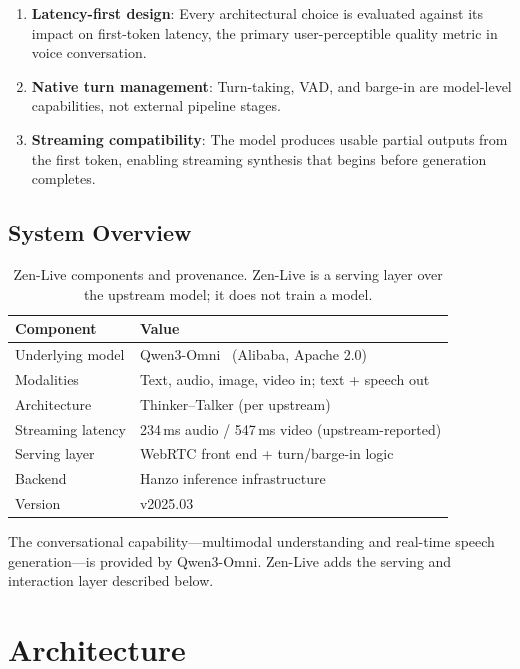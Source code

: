 \documentclass[11pt,a4paper]{article}
\begin{document}
\begin{enumerate}
  \item \textbf{Latency-first design}: Every architectural choice is evaluated against its impact on first-token latency, the primary user-perceptible quality metric in voice conversation.
  \item \textbf{Native turn management}: Turn-taking, VAD, and barge-in are model-level capabilities, not external pipeline stages.
  \item \textbf{Streaming compatibility}: The model produces usable partial outputs from the first token, enabling streaming synthesis that begins before generation completes.
\end{enumerate}

\subsection{System Overview}

\begin{table}[H]
\centering
\caption{Zen-Live components and provenance. Zen-Live is a serving layer over the
upstream model; it does not train a model.}
\begin{tabular}{ll}
\toprule
\textbf{Component} & \textbf{Value} \\
\midrule
Underlying model & Qwen3-Omni~\cite{qwen3omni} (Alibaba, Apache 2.0) \\
Modalities & Text, audio, image, video in; text + speech out \\
Architecture & Thinker--Talker (per upstream) \\
Streaming latency & 234\,ms audio / 547\,ms video (upstream-reported) \\
Serving layer & WebRTC front end + turn/barge-in logic \\
Backend & Hanzo inference infrastructure \\
Version & v2025.03 \\
\bottomrule
\end{tabular}
\end{table}

The conversational capability---multimodal understanding and real-time speech
generation---is provided by Qwen3-Omni. Zen-Live adds the serving and interaction
layer described below.

\section{Architecture}
\end{document}
